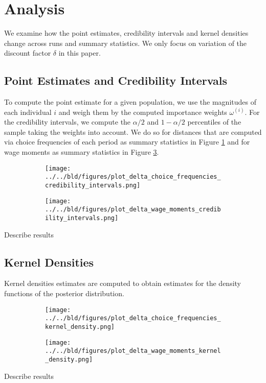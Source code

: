 \documentclass[11pt, a4paper, leqno]{article}
\begin{document}
\section{Analysis}
\label{sec:analysis}
We examine how the point estimates, credibility intervals and kernel densities change across runs and summary statistics. We only focus on variation of the discount factor $\delta$ in this paper.
\subsection{Point Estimates and Credibility Intervals}
\label{subsec:point_estimates}
To compute the point estimate for a given population, we use the magnitudes of each individual $i$ and weigh them by the computed importance weights $\omega^{(i)}$. For the credibility intervals, we compute the $\alpha/2$ and $1- \alpha/2$ percentiles of the sample taking the weights into account.  We do so for distances that are computed via choice frequencies of each period as summary statistics in Figure \ref{fig:choice_frequencies_ci} and for wage moments as summary statistics in Figure \ref{fig:wage_moments_ci}.
\begin{figure}[h!]
\caption{Credibility intervals for all respyabc runs.}
\begin{subfigure}{.5\textwidth}
  \centering
    \texttt{[image: ../../bld/figures/plot\_delta\_choice\_frequencies\_credibility\_intervals.png]}
  \label{fig:choice_frequencies_ci}
\end{subfigure}%
\begin{subfigure}{.5\textwidth}
  \centering
    \texttt{[image: ../../bld/figures/plot\_delta\_wage\_moments\_credibility\_intervals.png]}
  \label{fig:wage_moments_ci}
\end{subfigure}%

\end{figure}
Describe results
\subsection{Kernel Densities}
Kernel densities estimates are computed to obtain estimates for the density functions of the posterior distribution.
\label{subsec:kernel_densities}
\begin{figure}[h!]
\begin{subfigure}{.5\textwidth}
  \centering
    \texttt{[image: ../../bld/figures/plot\_delta\_choice\_frequencies\_kernel\_density.png]}
  \label{fig:kernel_density_ci}
\end{subfigure}%
\begin{subfigure}{.5\textwidth}
  \centering
    \texttt{[image: ../../bld/figures/plot\_delta\_wage\_moments\_kernel\_density.png]}
  \label{fig:kernel_density_ci}
\end{subfigure}%

\end{figure}
Describe results
\end{document}
